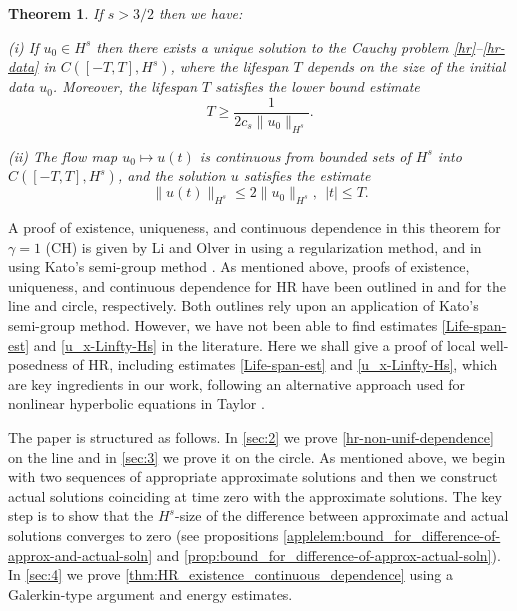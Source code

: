 \documentclass[12pt,reqno]{amsart}
\theoremstyle{plain}  %
\newtheorem{theorem}{Theorem}
\theoremstyle{definition}
\begin{document}
%
%
%
%
%
%
\begin{theorem}
\label{thm:HR_existence_continuous_dependence}
If   $s>3/2$  then we have:

(i) If $u_0\in H^s$  then  there exists a unique solution to
the Cauchy problem  \eqref{hr}--\eqref{hr-data} in $C([-T, T], H^s)$, where 
the lifespan  $T$ depends on the size
of the initial data $u_0$. Moreover, 
the  lifespan $T$ satisfies the lower bound estimate 
%
%
%
\begin{equation}
\label{Life-span-est}
T
\ge
\frac{1}{2c_s \|u_0\|_{H^s}}.
\end{equation}
%

(ii)
The flow map $u_0 \mapsto u(t)$ is continuous from
bounded sets of $H^s$ into \\ $C([-T, T], H^s)$,
and the solution $u$ satisfies the estimate
%
%
%
\begin{equation}
\label{u_x-Linfty-Hs}
\|
u(t)
\|_ {H^s}
\le
2
\|
u_0
\|_{H^s}, \ \ |t|\le T.
\end{equation}
%
%
%
\end{theorem}
%
%
A proof of existence, uniqueness, and continuous dependence in this 
theorem for $\gamma =1$ (CH) 
is given  by Li and Olver in 
\cite{Li_2000_Well-posedness-} using a regularization method, and in
\cite{Rodriguez-Blanco_2001_On-the-Cauchy-p} using 
Kato's semi-group method \cite{Kato_1975_Quasi-linear-eq}. As mentioned 
above, proofs of 
existence, uniqueness, and continuous dependence for  HR
have been outlined in \cite{Yin_2003_On-the-Cauchy-p} and 
\cite{Zhou_2005_Local-well-pose} for the line and circle, 
respectively. Both outlines rely upon an application of Kato's semi-group 
method. However, we have not been able to find estimates  
\eqref{Life-span-est} and \eqref{u_x-Linfty-Hs}  in the literature.
Here we shall give a proof of local well-posedness of HR,
including  estimates \eqref{Life-span-est} and \eqref{u_x-Linfty-Hs},
which are key ingredients in our work, 
following an alternative approach used for nonlinear hyperbolic equations
in Taylor \cite{Taylor_1991_Pseudodifferent}.




The  paper is structured as follows. In \autoref{sec:2} we prove 
\autoref{hr-non-unif-dependence} on the line and 
in  \autoref{sec:3}  we prove it on the circle.
As mentioned above, we begin with two sequences of
appropriate approximate solutions and then 
we construct  actual solutions
coinciding at time zero  with the approximate solutions.
The key  step  is to show that  the $H^s$-size of
the difference between approximate and actual solutions 
converges to zero (see propositions \ref{applelem:bound_for_difference-of-approx-and-actual-soln}
and  \ref{prop:bound_for_difference-of-approx-actual-soln}). 
In \autoref{sec:4} we  prove 
\autoref{thm:HR_existence_continuous_dependence} 
using a Galerkin-type argument and energy estimates.
%
%
%
%	
%
%
%
%
%
%
%
%
%
%
%
\end{document}
